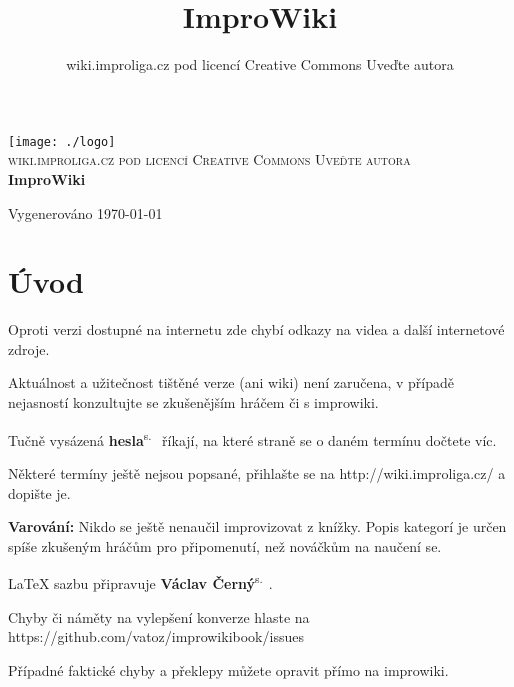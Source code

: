 \documentclass[a4paper,10pt,openany]{book}
\title{ImproWiki}
\author{wiki.improliga.cz pod licencí Creative Commons Uveďte autora}
\newcommand{\odkaz}[2]{ \textbf{#1}\textsuperscript{s.~\pageref{#2}}}
\begin{document}
\begin{titlepage}
\begin{center}

\texttt{[image: ./logo]}~\\[5cm]

\textsc{\Large wiki.improliga.cz pod licencí Creative Commons Uveďte autora }\\[0.5cm]

{ \huge \bfseries ImproWiki \\[0.4cm] }



\vfill

{\large Vygenerováno \today}

\end{center}




\end{titlepage}
 
\chapter{Úvod}\label{úvod}

 

Oproti verzi dostupné na internetu zde chybí odkazy na videa a další internetové zdroje.

Aktuálnost a užitečnost tištěné verze (ani wiki) není zaručena, v případě nejasností konzultujte se zkušenějším hráčem či s improwiki.

Tučně vysázená \odkaz{hesla}{úvod} říkají, na které straně se o daném termínu dočtete víc.

Některé termíny ještě nejsou popsané, přihlašte se na http://wiki.improliga.cz/ a dopište je.

\textbf{Varování:} Nikdo se ještě nenaučil improvizovat z knížky. Popis kategorí je určen spíše zkušeným hráčům pro připomenutí, než nováčkům na naučení se.  

\LaTeX{} sazbu připravuje  \odkaz{Václav Černý}{uživatel:vatoz}.

Chyby či náměty na vylepšení konverze hlaste na https://github.com/vatoz/improwikibook/issues

Případné faktické chyby a překlepy můžete opravit přímo na improwiki.
\end{document}
